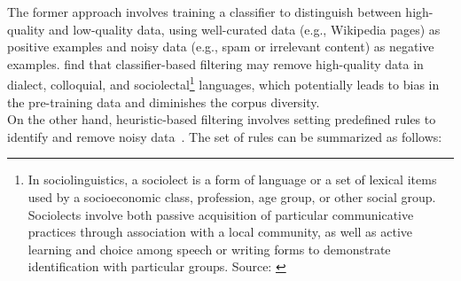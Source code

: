 The former approach involves training a classifier to distinguish between high-quality and low-quality data, using well-curated data (e.g., Wikipedia pages) as positive examples and noisy data (e.g., spam or irrelevant content) as negative examples.
\textcite{rae2021scaling, du2022glam} find that classifier-based filtering may remove high-quality data in dialect, colloquial, and sociolectal\footnote{In sociolinguistics, a sociolect is a form of language or a set of lexical items used by a socioeconomic class, profession, age group, or other social group. Sociolects involve both passive acquisition of particular communicative practices through association with a local community, as well as active learning and choice among speech or writing forms to demonstrate identification with particular groups. Source: \textcite{wikipedia}} languages, which potentially leads to bias in the pre-training data and diminishes the corpus diversity.\\
On the other hand, heuristic-based filtering involves setting predefined rules to identify and remove noisy data~\cite{workshop2023bloom, rae2021scaling}.
The set of rules can be summarized as follows:
